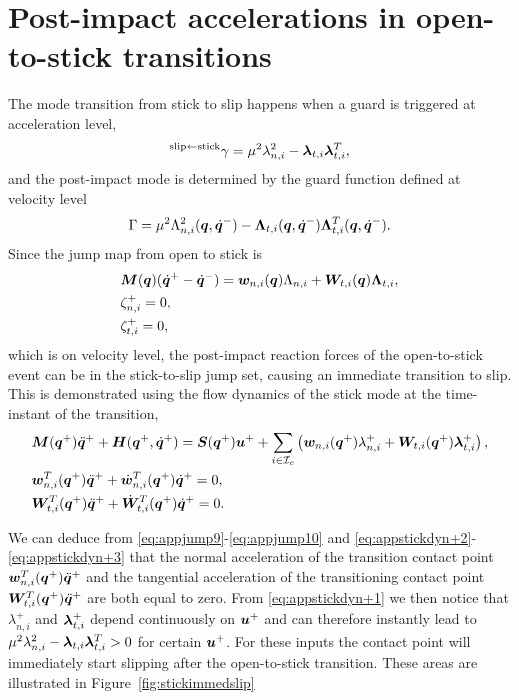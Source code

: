 \documentclass[../DC2017114Bouma.tex]{subfiles}
\begin{document}
\section{Post-impact accelerations in open-to-stick transitions}
The mode transition from stick to slip happens when a guard is triggered at acceleration level, 
\begin{align}
^{\text{slip}\leftarrow\text{stick}}\gamma = \mu^2\lambda_{n,i}^2 - \boldsymbol{\lambda}_{t,i}\boldsymbol{\lambda}_{t,i}^T,
\end{align}
and the post-impact mode is determined by the guard function defined at velocity level
\begin{align}
\Gamma = \mu^2 \Lambda_{n,i}^2({\boldsymbol{q}},\dot{{\boldsymbol{q}}}^-) - \boldsymbol{\Lambda}_{t,i}({\boldsymbol{q}},\dot{{\boldsymbol{q}}}^-)\boldsymbol{\Lambda}_{t,i}^T({\boldsymbol{q}},\dot{{\boldsymbol{q}}}^-). \label{eq:appopentostick}
\end{align}
Since the jump map from open to stick is
\begin{align}
&{\boldsymbol{M}}({\boldsymbol{q}})(\dot{{\boldsymbol{q}}}^+ - \dot{{\boldsymbol{q}}}^-) = {\boldsymbol{w}}_{n,i}({\boldsymbol{q}})\Lambda_{n,i} + {\boldsymbol{W}}_{t,i}({\boldsymbol{q}})\boldsymbol{\Lambda}_{t,i},\label{eq:appjump8}\\
&\zeta_{n,i}^+ = 0,\label{eq:appjump9}\\
&\zeta_{t,i}^+ = 0,\label{eq:appjump10}
\end{align}
which is on velocity level, the post-impact reaction forces of the open-to-stick event can be in the stick-to-slip jump set, causing an immediate transition to slip. This is demonstrated using the flow dynamics of the stick mode at the time-instant of the transition,
\begin{align}
&{\boldsymbol{M}}({\boldsymbol{q}}^+)\ddot{{\boldsymbol{q}}}^+ + {\boldsymbol{H}}({\boldsymbol{q}}^+,\dot{{\boldsymbol{q}}}^+) = {\boldsymbol{S}}({\boldsymbol{q}}^+){\boldsymbol{u}}^+ + \sum_{i\in\mathcal{I}_c}\left({\boldsymbol{w}}_{n,i}({\boldsymbol{q}}^+)\lambda^+_{n,i} + {\boldsymbol{W}}_{t,i}({\boldsymbol{q}}^+)\boldsymbol{\lambda}^+_{t,i} \right), \label{eq:appstickdyn+1}\\
&{\boldsymbol{w}}^T_{n,i}({\boldsymbol{q}}^+)\ddot{{\boldsymbol{q}}}^+ + \dot{{\boldsymbol{w}}}^T_{n,i}({\boldsymbol{q}}^+)\dot{{\boldsymbol{q}}}^+ = 0,\label{eq:appstickdyn+2}\\
&{\boldsymbol{W}}^T_{t,i}({\boldsymbol{q}}^+)\ddot{{\boldsymbol{q}}}^+ + \dot{{\boldsymbol{W}}}^T_{t,i}({\boldsymbol{q}}^+)\dot{{\boldsymbol{q}}}^+ = 0.\label{eq:appstickdyn+3}
\end{align}

We can deduce from \eqref{eq:appjump9}-\eqref{eq:appjump10} and \eqref{eq:appstickdyn+2}-\eqref{eq:appstickdyn+3} that the normal acceleration of the transition contact point ${\boldsymbol{w}}^T_{n,i}({\boldsymbol{q}}^+)\ddot{{\boldsymbol{q}}}^+$ and the tangential acceleration of the transitioning contact point ${\boldsymbol{W}}^T_{t,i}({\boldsymbol{q}}^+)\ddot{{\boldsymbol{q}}}^+$ are both equal to zero. From \eqref{eq:appstickdyn+1} we then notice that $\lambda_{n,i}^+$ and $\boldsymbol{\lambda}_{t,i}^+$ depend continuously on ${\boldsymbol{u}}^+$ and can therefore instantly lead to $\mu^2\lambda_{n,i}^2 - \boldsymbol{\lambda}_{t,i}\boldsymbol{\lambda}_{t,i}^T>0$ for certain ${\boldsymbol{u}}^+$. For these inputs the contact point will immediately start slipping after the open-to-stick transition. These areas are illustrated in Figure~\ref{fig:stickimmedslip}
\end{document}
